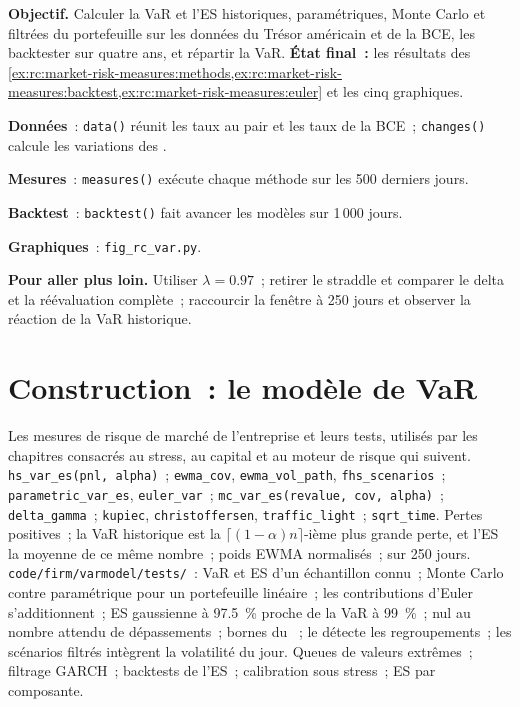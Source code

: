 \begin{tutorial}
\textbf{Objectif.} Calculer la VaR et l'ES historiques, paramétriques, Monte Carlo et filtrées du portefeuille
sur les données du Trésor américain et de la BCE, les backtester sur quatre ans, et répartir la VaR. \textbf{État final~:}
les résultats des
\cref{ex:rc:market-risk-measures:methods,ex:rc:market-risk-measures:backtest,ex:rc:market-risk-measures:euler}
et les cinq graphiques.
\begin{tutsteps}
\item \textbf{Données}~: \texttt{data()} réunit les taux au pair et les taux de la BCE~; \texttt{changes()}
calcule les variations des .
\item \textbf{Mesures}~: \texttt{measures()} exécute chaque méthode sur les 500 derniers jours.
\item \textbf{Backtest}~: \texttt{backtest()} fait avancer les modèles sur 1\,000 jours.
\item \textbf{Graphiques}~: \texttt{fig\_rc\_var.py}.
\end{tutsteps}
\textbf{Pour aller plus loin.} Utiliser $\lambda = 0.97$~; retirer le straddle et comparer le delta et la
réévaluation complète~; raccourcir la fenêtre à 250 jours et observer la réaction de la VaR historique.
\end{tutorial}

\section{Construction~: le modèle de VaR}\label{bld:rc:market-risk-measures:varmodel}

\begin{build}
 Les mesures de risque de marché de l'entreprise et leurs tests, utilisés par les chapitres
consacrés au stress, au capital et au moteur de risque qui suivent.
 \texttt{hs\_var\_es(pnl, alpha)}~; \texttt{ewma\_cov}, \texttt{ewma\_vol\_path},
\texttt{fhs\_scenarios}~; \texttt{parametric\_var\_es}, \texttt{euler\_var}~; \texttt{mc\_var\_es(revalue,
cov, alpha)}~; \texttt{delta\_gamma}~; \texttt{kupiec}, \texttt{christoffersen},
\texttt{traffic\_light}~; \texttt{sqrt\_time}.
 Pertes positives~; la VaR historique est la $\lceil(1-\alpha)n\rceil$-ième plus grande perte, et l'ES
la moyenne de ce même nombre~; poids EWMA normalisés~;  sur 250 jours.
 \texttt{code/firm/varmodel/tests/}~: VaR et ES d'un échantillon connu~;
Monte Carlo contre paramétrique pour un portefeuille linéaire~; les contributions d'Euler s'additionnent~; ES gaussienne à
97.5~\% proche de la VaR à 99~\%~;  nul au nombre attendu de dépassements~; bornes du ~;
le  détecte les regroupements~; les scénarios filtrés intègrent la volatilité du jour.
 Queues de valeurs extrêmes~; filtrage GARCH~; backtests de l'ES~; calibration sous stress~;
ES par composante.
\end{build}

